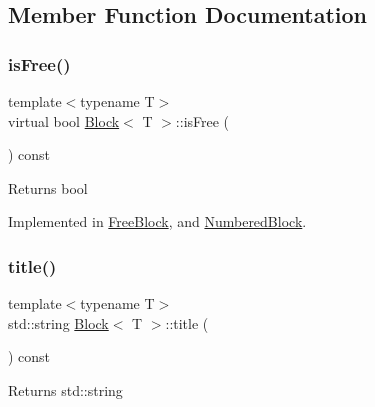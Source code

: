 \subsection{Member Function Documentation}
\mbox{\label{class_block_a795e0536746b840286cb1e74487311a9}} 
\subsubsection{\texorpdfstring{isFree()}{isFree()}}
{\footnotesize\ttfamily template$<$typename T$>$ \\
virtual bool \mbox{\hyperlink{class_block}{Block}}$<$ T $>$\+::is\+Free (\begin{DoxyParamCaption}{ }\end{DoxyParamCaption}) const\hspace{0.3cm}{\ttfamily [pure virtual]}}

\begin{DoxyReturn}{Returns}
bool 
\end{DoxyReturn}


Implemented in \mbox{\hyperlink{class_free_block_a76d3f40934d42c566095ee2f1386eac5}{Free\+Block}}, and \mbox{\hyperlink{class_numbered_block_a04899b0e9d90f4ce4faa8aae9e4140e9}{Numbered\+Block}}.

\mbox{\label{class_block_a48197972162fbfe6b2f4d721d80034cf}} 
\subsubsection{\texorpdfstring{title()}{title()}}
{\footnotesize\ttfamily template$<$typename T$>$ \\
std\+::string \mbox{\hyperlink{class_block}{Block}}$<$ T $>$\+::title (\begin{DoxyParamCaption}{ }\end{DoxyParamCaption}) const\hspace{0.3cm}{\ttfamily [inline]}}

\begin{DoxyReturn}{Returns}
std\+::string 
\end{DoxyReturn}
\mbox{\label{class_block_ab0b547f273f8d5e4e783ccedaf13ef26}} 
